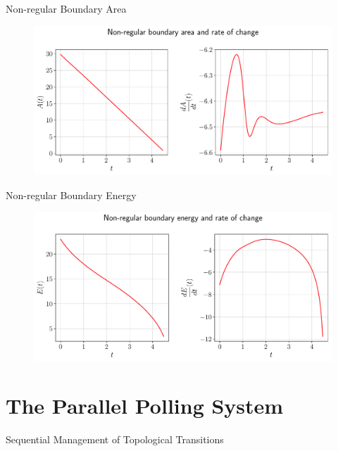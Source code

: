 \documentclass[usenames,dvipsnames]{beamer}
\begin{document}
\begin{frame}{Non-regular Boundary Area}
     \begin{figure}
        \centering
        \includegraphics[trim={0 0 0 0}, clip=true, scale=0.43]{figures/closed_boundary/nonregularboundary_area.pdf}
    \end{figure}
\end{frame}

\begin{frame}{Non-regular Boundary Energy}
     \begin{figure}
        \centering
        \includegraphics[trim={0 0 0 0}, clip=true, scale=0.43]{figures/closed_boundary/nonregularboundary_energy.pdf}
    \end{figure}
\end{frame}

\section{The Parallel Polling System}

\begin{frame}{Sequential Management of Topological Transitions}

\end{frame}
\end{document}
